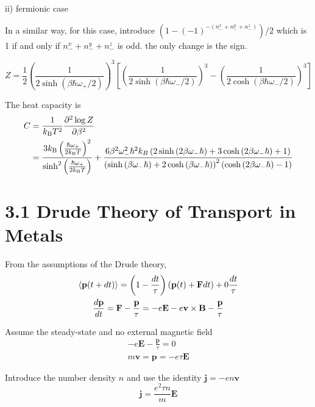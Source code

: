 \documentclass[a4paper,11pt]{article}
\begin{document}
ii) fermionic case

In a similar way, for this case, introduce $(1 - (-1)^{-(n_-^x + n_-^y + n_-^z)}) / 2$ which is 1 if and only if $n_-^x + n_-^y + n_-^z$ is odd. the only change is the sign.

\begin{equation}
    Z= \frac{1}{2}\left(\frac{1}{2\sinh(\beta\hbar\omega_+/2)}\right)^3\left[\left(\frac{1}{2\sinh(\beta\hbar\omega_-/2)}\right)^3 -\left(\frac{1}{2\cosh(\beta\hbar\omega_-/2)}\right)^3\right]
\end{equation}

The heat capacity is
\begin{align}
    C 
    &= \frac{1}{k_{\mathrm{B}} T^2}\frac{\partial^2\log Z}{\partial \beta^2} \\
    &= \frac{3k_{\mathrm{B}}\left(\frac{\hbar \omega_+}{2k_{\mathrm{B}} T}\right)^2}{\sinh^2\left(\frac{\hbar\omega_+}{2k_{\mathrm{B}} T}\right)} + \frac{6 \beta^{2} \omega_{-}^{2} \hbar^{2} k_{B} \left(2 \sinh{\left(2 \beta \omega_{-} \hbar \right)} + 3 \cosh{\left(2 \beta \omega_{-} \hbar \right)} + 1\right)}{\left(\sinh{\left(\beta \omega_{-} \hbar \right)} + 2 \cosh{\left(\beta \omega_{-} \hbar \right)}\right)^{2} \left(\cosh{\left(2 \beta \omega_{-} \hbar \right)} - 1\right)}
\end{align}








\section{3.1 Drude Theory of Transport in Metals}

From the assumptions of the Drude theory,
\begin{gather}
    \braket{\mathbf p(t+dt)} = \left(1 - \frac{dt}{\tau}\right)\left(\mathbf p(t) + \mathbf Fdt\right) + 0\frac{dt}{\tau}\\
    \frac{d\mathbf p}{dt}=\mathbf F-\frac{\mathbf p}{\tau}=-e\mathbf E-e\mathbf v\times\mathbf B-\frac{\mathbf p}{\tau}
\end{gather}

Assume the steady-state and no external magnetic field
\begin{gather}
    -e\mathbf E -\frac{\mathbf p}{\tau} = 0\\
    m\mathbf v = \mathbf p = -e\tau\mathbf E
\end{gather}

Introduce the number density $n$ and use the identity $\mathbf j = -en\mathbf v$
\begin{equation}
    \mathbf j = \frac{e^2\tau n}{m}\mathbf E
\end{equation}
\end{document}
